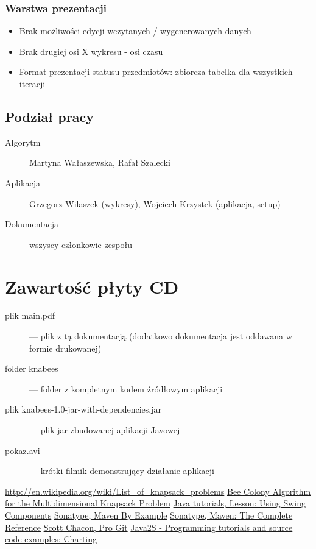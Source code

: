 \documentclass[a4paper,12pt,notitlepage]{mwrep}
\begin{document}
\subsection{Warstwa prezentacji}
\begin{itemize}
	\item	Brak możliwości edycji wczytanych / wygenerowanych danych
	\item	Brak drugiej osi X wykresu - osi czasu
	\item	Format prezentacji statusu przedmiotów: zbiorcza tabelka dla wszystkich iteracji
\end{itemize}

\section{Podział pracy}
\begin{description}
	\item[Algorytm] Martyna Wałaszewska, Rafał Szalecki
	\item[Aplikacja] Grzegorz Wilaszek (wykresy), Wojciech Krzystek (aplikacja, setup)
	\item[Dokumentacja] wszyscy członkowie zespołu
\end{description}


\addtocounter{page}{-1}

\appendix
\chapter*{Zawartość płyty CD}
\begin{description}
	\item[plik main.pdf]	 --- plik z tą dokumentacją (dodatkowo dokumentacja jest oddawana w formie drukowanej)
	\item[folder knabees]	 --- folder z kompletnym kodem źródłowym aplikacji
	\item[plik knabees-1.0-jar-with-dependencies.jar]	 --- plik jar zbudowanej aplikacji Javowej
	\item[pokaz.avi]	 --- krótki filmik demonstrujący działanie aplikacji
\end{description}

\begin{thebibliography}{9}

	\href{http://en.wikipedia.org/wiki/List_of_knapsack_problems}{http://en.wikipedia.org/wiki/List\_of\_knapsack\_problems}
	\href{http://www.iaeng.org/publication/IMECS2008/IMECS2008_pp84-88.pdf}{Bee Colony Algorithm for the Multidimensional Knapsack Problem}
	\href{http://docs.oracle.com/javase/tutorial/uiswing/components/index.html}{Java tutorials, Lesson: Using Swing Components}
	\href{http://www.sonatype.com/Support/Books/Maven-By-Example}{Sonatype, Maven By Example}
	\href{http://www.sonatype.com/Support/Books/Maven-The-Complete-Reference}{Sonatype, Maven: The Complete Reference}
	\href{http://git-scm.com/book/}{Scott Chacon, Pro Git}
	\href{http://www.java2s.com/Code/Java/Chart/CatalogChart.htm}{Java2S - Programming tutorials and source code examples: Charting}

\end{thebibliography}


\listoffigures


\label{LastPage}
\end{document}
